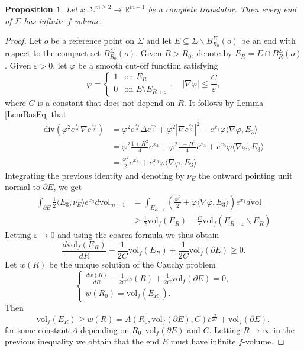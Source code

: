 \documentclass[11pt, leqno]{amsart}
\newtheorem{proposition}[theorem]{Proposition}
\begin{document}
\begin{proposition}\label{InfVolTransl}
Let $x:\Sigma^{m\geq 2}\to\mathbb{R}^{m+1}$ be a complete translator. Then every end of $\Sigma$ has infinite $f$-volume. 
\end{proposition}
\begin{proof}
Let $o$ be a reference point on $\Sigma$ and let $E\subseteq \Sigma\backslash B^\Sigma_{R_0}(o)$ be an end with respect to the compact set $B^\Sigma_{R_0}(o)$. Given $R>R_{0}$, denote by $E_R=E\cap B^\Sigma_{R}(o)$. Given $\varepsilon>0$, let $\varphi$ be a smooth cut-off function satisfying
\[
\varphi=\begin{cases}
1 & \textrm{on } E_R\\
0 & \textrm{on } E \setminus E_{R+\varepsilon}
\end{cases},
\quad |\nabla\varphi|\leq \frac{C}{\varepsilon},
\]
where $C$ is a constant that does not depend on $R$.
It follows by Lemma \ref{LemBasEq} that
\begin{align*}
\mathrm{div}(\varphi^2e^{\frac{x_3}{2}}\nabla e^{\frac{x_3}{2}})&=\varphi^2 e^{\frac{x_3}{2}}\Delta e^{\frac{x_3}{2}}+\varphi^2 |\nabla e^{\frac{x_3}{2}}|^2+e^{x_3}\varphi\langle \nabla \varphi, E_{3}\rangle\\
&=\varphi^2\frac{1+H^2}{4}e^{x_3}+\varphi^2\frac{1-H^2}{4}e^{x_3}+e^{x_3}\varphi\langle \nabla \varphi, E_{3}\rangle\\
&=\frac{\varphi^2}{2}e^{x_3}+e^{x_3}\varphi\langle \nabla \varphi, E_{3}\rangle.
\end{align*}
Integrating the previous identity and denoting by $\nu_{E}$ the outward pointing unit normal to $\partial E$, we get
\begin{align*}
\int_{\partial E} \frac{1}{2}\langle E_3,\nu_E\rangle e^{x_3}d\mathrm{vol}_{m-1}&=\int_{E_{R+\varepsilon}}\left(\frac{\varphi^2}{2}+\varphi\langle \nabla \varphi, E_{3}\rangle\right)e^{x_3}d\mathrm{vol}\\
&\geq \frac12 \mathrm{vol}_f(E_R)-\frac{C}{\varepsilon}\mathrm{vol}_f(E_{R+\varepsilon}\backslash E_R)
\end{align*}
Letting $\varepsilon\rightarrow 0$ and using the coarea formula we thus obtain
\[
\frac{d\mathrm{vol}_f(E_R)}{dR}-\frac{1}{2C}\mathrm{vol}_f(E_R)+\frac{1}{2C} \mathrm{vol}_f(\partial E)\geq0.
\]
Let $w(R)$ be the unique solution of the Cauchy problem
\[
\begin{cases}
\frac{dw(R)}{dR}-\frac{1}{2C}w(R)+\frac{1}{2C} \mathrm{vol}_f(\partial E)=0,\\
w(R_0)=\mathrm{vol}_f(E_{R_0}).
\end{cases}
\]
 Then
\[
\mathrm{vol}_f(E_R)\geq w(R)=A(R_0,\mathrm{vol}_f(\partial{E}),C)e^{\frac{R}{2C}}+\mathrm{vol}_f(\partial E),
\]
for some constant $A$ depending on $R_{0}, \mathrm{vol}_{f}(\partial E)$ and $C$. Letting $R\rightarrow \infty$ in the previous inequality we obtain that the end $E$ must have infinite $f$-volume. 
\end{proof}
\end{document}
